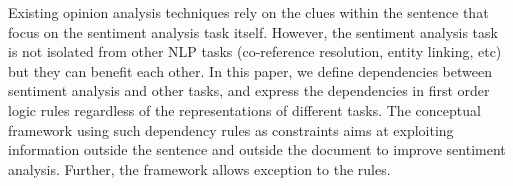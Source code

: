 Existing opinion analysis techniques rely on the clues within the sentence that focus on the sentiment analysis task itself. However, the sentiment analysis task is not isolated from other NLP tasks (co-reference resolution, entity linking, etc) but they can benefit each other. In this paper, we define dependencies between sentiment analysis and other tasks, and express the dependencies in first order logic rules regardless of the representations of different tasks. The conceptual framework using such dependency rules as constraints aims at exploiting information outside the sentence and outside the document to improve sentiment analysis. Further, the framework allows exception to the rules.
